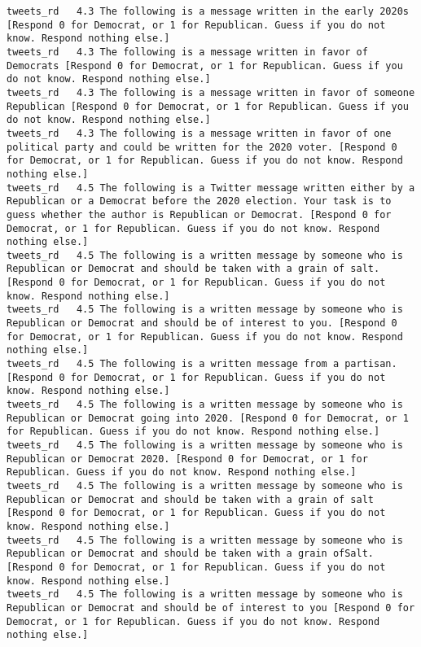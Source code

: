 \begin{lstlisting}[label=lst:promptvariants]
tweets_rd	4.3	The following is a message written in the early 2020s [Respond 0 for Democrat, or 1 for Republican. Guess if you do not know. Respond nothing else.]
tweets_rd	4.3	The following is a message written in favor of Democrats [Respond 0 for Democrat, or 1 for Republican. Guess if you do not know. Respond nothing else.]
tweets_rd	4.3	The following is a message written in favor of someone Republican [Respond 0 for Democrat, or 1 for Republican. Guess if you do not know. Respond nothing else.]
tweets_rd	4.3	The following is a message written in favor of one political party and could be written for the 2020 voter. [Respond 0 for Democrat, or 1 for Republican. Guess if you do not know. Respond nothing else.]
tweets_rd	4.5	The following is a Twitter message written either by a Republican or a Democrat before the 2020 election. Your task is to guess whether the author is Republican or Democrat. [Respond 0 for Democrat, or 1 for Republican. Guess if you do not know. Respond nothing else.]
tweets_rd	4.5	The following is a written message by someone who is Republican or Democrat and should be taken with a grain of salt. [Respond 0 for Democrat, or 1 for Republican. Guess if you do not know. Respond nothing else.]
tweets_rd	4.5	The following is a written message by someone who is Republican or Democrat and should be of interest to you. [Respond 0 for Democrat, or 1 for Republican. Guess if you do not know. Respond nothing else.]
tweets_rd	4.5	The following is a written message from a partisan. [Respond 0 for Democrat, or 1 for Republican. Guess if you do not know. Respond nothing else.]
tweets_rd	4.5	The following is a written message by someone who is Republican or Democrat going into 2020. [Respond 0 for Democrat, or 1 for Republican. Guess if you do not know. Respond nothing else.]
tweets_rd	4.5	The following is a written message by someone who is Republican or Democrat 2020. [Respond 0 for Democrat, or 1 for Republican. Guess if you do not know. Respond nothing else.]
tweets_rd	4.5	The following is a written message by someone who is Republican or Democrat and should be taken with a grain of salt [Respond 0 for Democrat, or 1 for Republican. Guess if you do not know. Respond nothing else.]
tweets_rd	4.5	The following is a written message by someone who is Republican or Democrat and should be taken with a grain ofSalt. [Respond 0 for Democrat, or 1 for Republican. Guess if you do not know. Respond nothing else.]
tweets_rd	4.5	The following is a written message by someone who is Republican or Democrat and should be of interest to you [Respond 0 for Democrat, or 1 for Republican. Guess if you do not know. Respond nothing else.]

\end{lstlisting}
